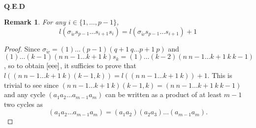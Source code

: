 \documentclass[11pt]{article}
\numberwithin{Property}{section}
\numberwithin{Theorem}{section}
\numberwithin{Proposition}{section}
\numberwithin{Lemma}{section}
\numberwithin{Corollary}{section}
\numberwithin{Definition}{section}
\newtheorem{Remark}{Remark}%
\numberwithin{Remark}{section}
\numberwithin{Conjecture}{section}
\numberwithin{Problem}{section}
\numberwithin{Example}{section}
\numberwithin{Claim}{section}
\begin{document}
\hspace{12cm} $\mathbf{Q.E.D}$

\begin{Remark} \label{rk7} For any $i \in \{1, \ldots, p-1\}$,
\begin{equation} \label{eee}
l(\sigma_{\tilde{w}}s_{p-1} \ldots s_{i+1}s_i) = l(\sigma_{\tilde{w}}s_{p-1} \ldots s_{i+1}) + 1
\end{equation}
\end{Remark}
\begin{proof}
Since $\sigma_{\tilde{w}} = (1)\ldots (p-1)(q+1 \ q \ldots p+1 \ p)$ and $(1)\ldots (k-1)(n \ n-1 \ldots k+1 \ k)s_{k} = (1)\ldots (k-2)(n \ n-1 \ldots k+1 \ k \ k-1)$, so to obtain $\cref{eee}$, it sufficies to prove that $l((n \ n-1 \ldots k+1 \ k)(k-1,k)) = l((n \ n-1 \ldots k+1 \ k)) + 1$. This is trivial to see since $(n \ n-1 \ldots k+1 \ k)(k-1,k) = (n \ n-1 \ldots k+1 \ k \ k-1)$ and any cycle $(a_1a_2\ldots a_{m-1}a_m)$ can be written as a product of at least $m-1$ two cycles as
\[
(a_1a_2\ldots a_{m-1}a_m) = (a_1a_2)(a_2a_3)\ldots(a_{m-1}a_m).
\]
\end{proof}
\label{subsec:red}
\end{document}
